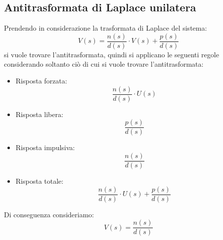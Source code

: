 \documentclass[a4paper]{article}
\begin{document}
\subsection{Antitrasformata di Laplace unilatera}
Prendendo in considerazione la trasformata di Laplace del sistema:
\[
  V(s) = \frac{n(s)}{d(s)} \cdot V(s) + \frac{p(s)}{d(s)}
\] 
si vuole trovare l'antitrasformata, quindi si applicano le seguenti regole considerando
soltanto ciò di cui si vuole trovare l'antitrasformata:
\begin{itemize}
  \item Risposta forzata:
    \[
    \frac{n(s)}{d(s)} \cdot U(s)
    \] 

  \item Risposta libera:
    \[
    \frac{p(s)}{d(s)}
    \]

  \item Risposta impulsiva:
    \[
    \frac{n(s)}{d(s)}
    \]

  \item Risposta totale:
    \[
    \frac{n(s)}{d(s)} \cdot U(s) + \frac{p(s)}{d(s)}
    \]
\end{itemize}
Di conseguenza consideriamo:
\[
V(s) = \frac{n(s)}{d(s)}
\] 
\end{document}
